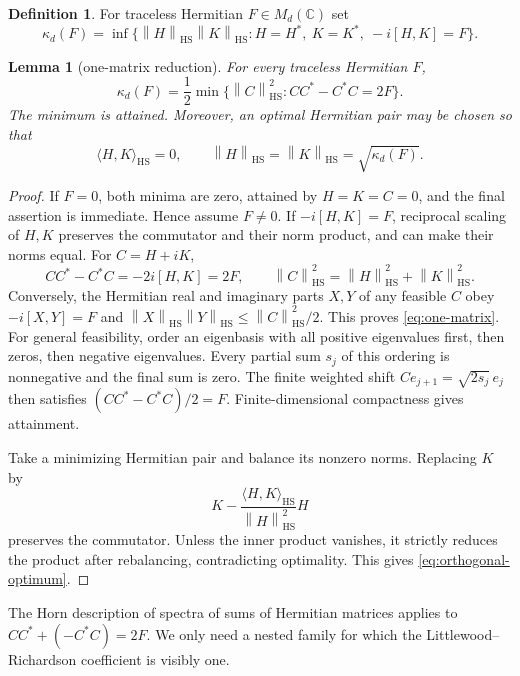 \documentclass[11pt]{article}
\newtheorem{lemma}[theorem]{Lemma}
\theoremstyle{definition}
\newtheorem{definition}[theorem]{Definition}
\theoremstyle{remark}
\newcommand{\1}{\mathbf 1}
\newcommand{\norm}[1]{\left\lVert#1\right\rVert}
\newcommand{\HS}{\mathrm{HS}}
\begin{document}
\begin{definition}
For traceless Hermitian $F\in M_d(\mathbb C)$ set
\begin{equation}
 \kappa_d(F)=\inf\{\norm H_{\HS}\norm K_{\HS}:H=H^*,\ K=K^*,\ -i[H,K]=F\}.
 \label{eq:kappa}
\end{equation}
\end{definition}

\begin{lemma}[one-matrix reduction]
\label{lem:one-matrix}
For every traceless Hermitian $F$,
\begin{equation}
 \kappa_d(F)=\frac12\min\{\norm C_{\HS}^2:CC^*-C^*C=2F\}.
 \label{eq:one-matrix}
\end{equation}
The minimum is attained.  Moreover, an optimal Hermitian pair may be chosen
so that
\begin{equation}
 \langle H,K\rangle_{\HS}=0,
 \qquad \norm H_{\HS}=\norm K_{\HS}=\sqrt{\kappa_d(F)}.
 \label{eq:orthogonal-optimum}
\end{equation}
\end{lemma}

\begin{proof}
If $F=0$, both minima are zero, attained by $H=K=C=0$, and the final
assertion is immediate.  Hence assume $F\ne0$.
If $-i[H,K]=F$, reciprocal scaling of $H,K$ preserves the commutator and
their norm product, and can make their norms equal.  For $C=H+iK$,
\[
 CC^*-C^*C=-2i[H,K]=2F,
 \qquad
 \norm C_{\HS}^2=\norm H_{\HS}^2+\norm K_{\HS}^2.
\]
Conversely, the Hermitian real and imaginary parts $X,Y$ of any feasible
$C$ obey $-i[X,Y]=F$ and
$\norm X_{\HS}\norm Y_{\HS}\le\norm C_{\HS}^2/2$.  This proves
\eqref{eq:one-matrix}.  For general feasibility, order an eigenbasis with all
positive eigenvalues first, then zeros, then negative eigenvalues.  Every
partial sum $s_j$ of this ordering is nonnegative and the final sum is zero.
The finite weighted shift $Ce_{j+1}=\sqrt{2s_j}\,e_j$ then satisfies
$(CC^*-C^*C)/2=F$.  Finite-dimensional compactness gives attainment.

Take a minimizing Hermitian pair and balance its nonzero norms.  Replacing
$K$ by
\[
 K-\frac{\langle H,K\rangle_{\HS}}{\norm H_{\HS}^2}H
\]
preserves the commutator.  Unless the inner product vanishes, it strictly
reduces the product after rebalancing, contradicting optimality.  This gives
\eqref{eq:orthogonal-optimum}.
\end{proof}

The Horn description of spectra of sums of Hermitian matrices
\cite{horn1962,klyachko1998,knutson1999,fulton2000} applies to
$CC^*+(-C^*C)=2F$.  We only need a nested family for which the
Littlewood--Richardson coefficient is visibly one.
\end{document}
